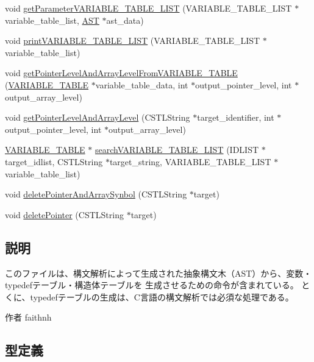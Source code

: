 \begin{DoxyCompactItemize}
\item 
void \hyperlink{Synbol_8h_a823d2eaaec934739c5ff3ebd1843d258}{getParameterVARIABLE\_\-TABLE\_\-LIST} (VARIABLE\_\-TABLE\_\-LIST $\ast$variable\_\-table\_\-list, \hyperlink{structabstract__syntax__tree}{AST} $\ast$ast\_\-data)
\item 
void \hyperlink{Synbol_8h_aa0d5516918a872d6f17450c510482994}{printVARIABLE\_\-TABLE\_\-LIST} (VARIABLE\_\-TABLE\_\-LIST $\ast$variable\_\-table\_\-list)
\item 
void \hyperlink{Synbol_8h_a5b46f7c05dd827544128d6ce0bff2ada}{getPointerLevelAndArrayLevelFromVARIABLE\_\-TABLE} (\hyperlink{structvariable__table}{VARIABLE\_\-TABLE} $\ast$variable\_\-table\_\-data, int $\ast$output\_\-pointer\_\-level, int $\ast$output\_\-array\_\-level)
\item 
void \hyperlink{Synbol_8h_a0c1787648bcdd921d8b6372e90115d34}{getPointerLevelAndArrayLevel} (CSTLString $\ast$target\_\-identifier, int $\ast$output\_\-pointer\_\-level, int $\ast$output\_\-array\_\-level)
\item 
\hyperlink{structvariable__table}{VARIABLE\_\-TABLE} $\ast$ \hyperlink{Synbol_8h_a22dbc5727793ae91c80b9b95f1e06d11}{searchVARIABLE\_\-TABLE\_\-LIST} (IDLIST $\ast$target\_\-idlist, CSTLString $\ast$target\_\-string, VARIABLE\_\-TABLE\_\-LIST $\ast$variable\_\-table\_\-list)
\item 
void \hyperlink{Synbol_8h_acc3cd8275754e5412501748b96b6f23e}{deletePointerAndArraySynbol} (CSTLString $\ast$target)
\item 
void \hyperlink{Synbol_8h_a865793639f2aa40d0c7e5101f130ac3e}{deletePointer} (CSTLString $\ast$target)
\end{DoxyCompactItemize}


\subsection{説明}
このファイルは、構文解析によって生成された抽象構文木（AST）から、変数・typedefテーブル・構造体テーブルを 生成させるための命令が含まれている。 とくに、typedefテーブルの生成は、C言語の構文解析では必須な処理である。 \begin{DoxyAuthor}{作者}
faithnh 
\end{DoxyAuthor}


\subsection{型定義}
